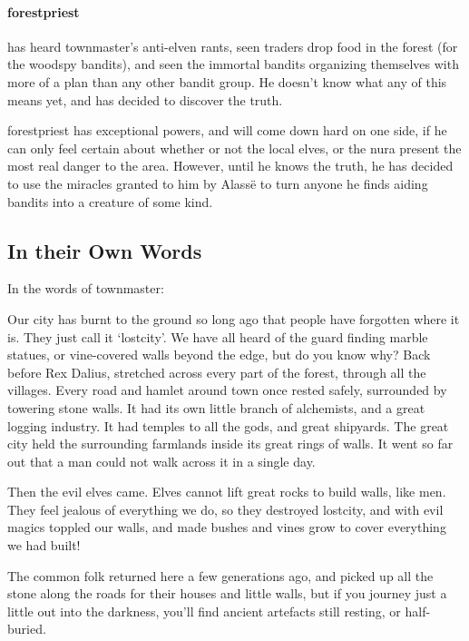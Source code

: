 \begin{multicols}{2}
\paragraph{\gls{forestpriest}}
has heard \gls{townmaster}'s anti-elven rants, seen traders drop food in the forest (for the woodspy bandits), and seen the immortal bandits organizing themselves with more of a plan than any other bandit group.
He doesn't know what any of this means yet, and has decided to discover the truth.

\Gls{forestpriest} has exceptional powers, and will come down hard on one side, if he can only feel certain about whether or not the local elves, or the nura present the most real danger to the area.
However, until he knows the truth, he has decided to use the miracles granted to him by Alass\"e to turn anyone he finds aiding bandits into a creature of some kind.


\subsection{In their Own Words}
\label{expanding_wilderness}

In the words of \gls{townmaster}:

\begin{exampletext}

  Our city has burnt to the ground so long ago that people have forgotten where it is.
  They just call it `\gls{lostcity}'.
  We have all heard of the \gls{guard} finding marble statues, or vine-covered walls beyond the \gls{edge}, but do you know why?
  Back before Rex Dalius,  stretched across every part of the forest, through all the \glspl{village}.
  Every road and hamlet around \gls{town} once rested safely, surrounded by towering stone walls.
  It had its own little branch of \gls{alchemists}, and a great logging industry.
  It had temples to all the gods, and great shipyards.
  The great city held the surrounding farmlands inside its great rings of walls.
  It went so far out that a man could not walk across it in a single day.

  Then the evil elves came.
  Elves cannot lift great rocks to build walls, like men.
  They feel jealous of everything we do, so they destroyed \gls{lostcity}, and with evil magics toppled our walls, and made bushes and vines grow to cover everything we had built!

  The common folk returned here a few generations ago, and picked up all the stone along the roads for their houses and little walls, but if you journey just a little out into the darkness, you'll find ancient artefacts still resting, or half-buried.


\end{exampletext}
\end{multicols}
